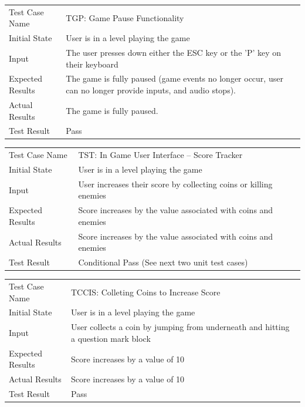 \documentclass[12pt, titlepage]{article}
\begin{document}
\begin{center}
\begin{tabular}{ | l | p{10cm} | }
\hline
Test Case Name & TGP: Game Pause Functionality	\\
Initial State & User is in a level playing the game	\\
Input & The user presses down either the ESC key or the 'P' key on their keyboard	\\
Expected Results & The game is fully paused (game events no longer occur, user can no longer provide inputs, and audio stops).	\\
Actual Results & The game is fully paused.	\\
Test Result & Pass	\\
\hline
\end{tabular}
\end{center}

\begin{center}
\begin{tabular}{ | l | p{10cm} | }
\hline
Test Case Name & TST: In Game User Interface – Score Tracker	\\
Initial State & User is in a level playing the game	\\
Input & User increases their score by collecting coins or killing enemies	\\
Expected Results & Score increases by the value associated with coins and enemies	\\
Actual Results & Score increases by the value associated with coins and enemies	\\
Test Result & Conditional Pass (See next two unit test cases)	\\
\hline
\end{tabular}
\end{center}

\begin{center}
\begin{tabular}{ | l | p{10cm} | }
\hline
Test Case Name & TCCIS: Colleting Coins to Increase Score	\\
Initial State & User is in a level playing the game	\\
Input & User collects a coin by jumping from underneath and hitting a question mark block	\\
Expected Results & Score increases by a value of 10	\\
Actual Results & Score increases by a value of 10	\\
Test Result & Pass	\\
\hline
\end{tabular}
\end{center}
\end{document}
